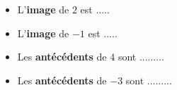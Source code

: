 \documentclass[
	classe=$1^{ere}$STI2D
]{coursclass}
\begin{document}
\begin{exemple}
\begin{minipage}{0.3\linewidth}
\begin{center}
			\begin{itemize}
				\item L'\textbf{image} de $2$ est .....\vspace{0.5em}
				\item L'\textbf{image} de $-1$ est .....\vspace{0.5em}
				\item Les \textbf{antécédents} de $4$ sont .........\vspace{0.5em}
				\item Les \textbf{antécédents} de $-3$ sont .........
			\end{itemize}
		\end{center}
	\end{minipage}
\end{exemple}
\end{document}
